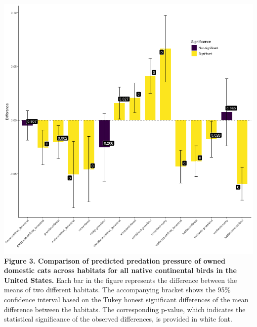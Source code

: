 \documentclass[
  super,
  review,
  3p]{elsarticle}
\begin{document}
\includegraphics{Figure3.png} \textbf{Figure 3. Comparison of predicted
predation pressure of owned domestic cats across habitats for all native
continental birds in the United States.} Each bar in the figure
represents the difference between the means of two different habitats.
The accompanying bracket shows the 95\% confidence interval based on the
Tukey honest significant differences of the mean difference between the
habitats. The corresponding p-value, which indicates the statistical
significance of the observed differences, is provided in white font.
\end{document}
